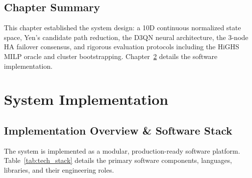 \documentclass[12pt,a4paper,oneside]{report}
\begin{document}
\section{Chapter Summary}
This chapter established the system design: a 10D continuous normalized state space, Yen's candidate path reduction, the D3QN neural architecture, the 3-node HA failover consensus, and rigorous evaluation protocols including the HiGHS MILP oracle and cluster bootstrapping. Chapter~\ref{chap:implementation} details the software implementation.

\chapter{System Implementation}
\label{chap:implementation}

\section{Implementation Overview \& Software Stack}
The system is implemented as a modular, production-ready software platform. Table~\ref{tab:tech_stack} details the primary software components, languages, libraries, and their engineering roles.
\end{document}
